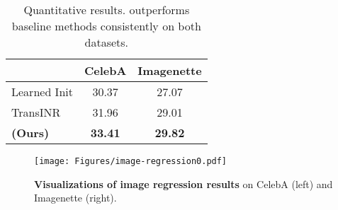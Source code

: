 \begin{table}[htbp]
\centering
{}
\caption{Performance comparison of different models with varying numbers of context views.}
\label{tab:comparison-gnt}
\end{table}





\begin{table}[htbp]
    \centering
    \begin{tabular}{lcc}
        \toprule
                 & CelebA & Imagenette \\ \midrule
        Learned Init \citep{tancik2021learned} & 30.37  & 27.07       \\
        TransINR~\citep{chen2022transformers}  & 31.96  & 29.01       \\ 
        \rowcolor{lightblue}
        \textbf{\method{} (Ours)}         & \textbf{33.41}  & \textbf{29.82}      \\ 
        \bottomrule
    \end{tabular}
    \caption{Quantitative results. \method{} outperforms baseline methods consistently on both datasets.}
    \label{tab:image-regression}
\end{table}


\begin{figure}[htbp]
    \centering
    \begin{minipage}[b]{0.49\textwidth} 
        \texttt{[image: Figures/image-regression0.pdf]} %
        \caption{\textbf{Visualizations of image regression results} on CelebA (left) and Imagenette (right).}
        \label{fig:visualization-image-regression}
    \end{minipage}
\end{figure}


